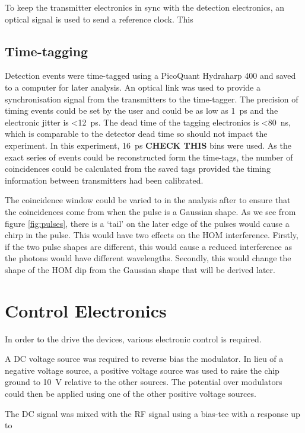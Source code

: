 To keep the transmitter electronics in sync with the detection electronics, an optical signal is used to send a reference clock. This 

\subsection{Time-tagging}

Detection events were time-tagged using a PicoQuant Hydraharp 400 and saved to a computer for later analysis. An optical link was used to provide a synchronisation signal from the transmitters to the time-tagger. The precision of timing events could be set by the user and could be as low as \SI{1}{\ps} and the electronic jitter is \SI{<12}{\ps}. The dead time of the tagging electronics is \SI{<80}{\ns}, which is comparable to the detector dead time so should not impact the experiment. In this experiment, \SI{16}{\ps} \textbf{CHECK THIS} bins were used. As the exact series of events could be reconstructed form the time-tags, the number of coincidences could be calculated from the saved tags provided the timing information between transmitters had been calibrated.

The coincidence window could be varied to in the analysis after to ensure that the coincidences come from when the pulse is a Gaussian shape. As we see from figure \ref{fig:pulses}, there is a `tail' on the later edge of the pulses would cause a chirp in the pulse. This would have two effects on the \ac{HOM} interference. Firstly, if the two pulse shapes are different, this would cause a reduced interference as the photons would have different wavelengths. Secondly, this would change the shape of the \ac{HOM} dip from the Gaussian shape that will be derived later.

\section{Control Electronics}

In order to the drive the devices, various electronic control is required. 

A DC voltage source was required to reverse bias the modulator. In lieu of a negative voltage source, a positive voltage source was used to raise the chip ground to \SI{10}{\V} relative to the other sources. The potential over modulators could then be applied using one of the other positive voltage sources.

The DC signal was mixed with the RF signal using a bias-tee with a response up to 

